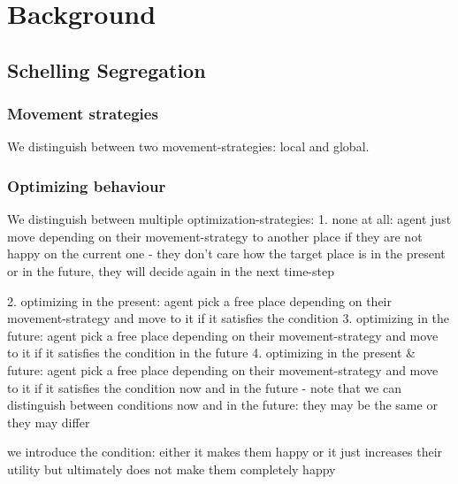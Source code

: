 \section{Background}
\subsection{Schelling Segregation}

\subsubsection{Movement strategies}
We distinguish between two movement-strategies: local and global.

\subsubsection{Optimizing behaviour}
We distinguish between multiple optimization-strategies: 
	1. none at all: 				agent just move depending on their movement-strategy to another place if they are not happy on the current one - they don't care how the target place is in the present or in the future, they will decide again in the next time-step
	
	2. optimizing in the present: 				agent pick a free place depending on their movement-strategy and move to it if it satisfies the condition
	3. optimizing in the future: 				agent pick a free place depending on their movement-strategy and move to it if it satisfies the condition in the future
	4. optimizing in the present \& future: 	agent pick a free place depending on their movement-strategy and move to it if it satisfies the condition now and in the future - note that we can distinguish between conditions now and in the future: they may be the same or they may differ
	
	we introduce the condition: either it makes them happy or it just increases their utility but ultimately does not make them completely happy